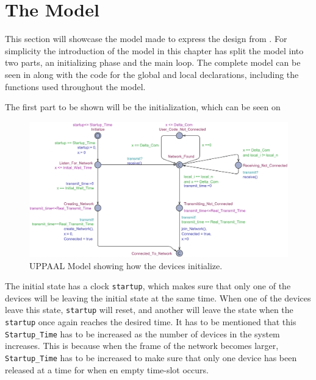 \section{The Model}
This section will showcase the model made to express the design from .
For simplicity the introduction of the model in this chapter has split the model into two parts, an initializing phase and the main loop.
The complete model can be seen in  along with the code for the global and local declarations, including the functions used throughout the model.

The first part to be shown will be the initialization, which can be seen on 

\begin{figure}
  \includegraphics[width=1\textwidth]{Figures/Model/Device_Connecting.pdf} 
\caption{UPPAAL Model showing how the devices initialize.}
\label{fig:UPPAAL_Intitialization}
\end{figure}

The initial state has a clock \texttt{startup}, which makes sure that only one of the devices will be leaving the initial state at the same time.
When one of the devices leave this state, \texttt{startup} will reset, and another will leave the state when the \texttt{startup} once again reaches the desired time.
It has to be mentioned that this \texttt{Startup\_Time} has to be increased as the number of devices in the system increases.
This is because when the frame of the network becomes larger, \texttt{Startup\_Time} has to be increased to make sure that only one device has been released at a time for when en empty time-slot occurs.


